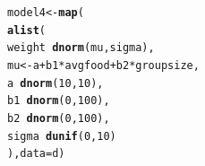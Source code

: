 \documentclass[12pt]{article}\usepackage[]{graphicx}\usepackage[]{color}
\makeatletter
\newcommand{\hlnum}[1]{\textcolor[rgb]{0.686,0.059,0.569}{#1}}%
\newcommand{\hlopt}[1]{\textcolor[rgb]{0,0,0}{#1}}%
\newcommand{\hlstd}[1]{\textcolor[rgb]{0.345,0.345,0.345}{#1}}%
\newcommand{\hlkwb}[1]{\textcolor[rgb]{0.69,0.353,0.396}{#1}}%
\newcommand{\hlkwc}[1]{\textcolor[rgb]{0.333,0.667,0.333}{#1}}%
\newcommand{\hlkwd}[1]{\textcolor[rgb]{0.737,0.353,0.396}{\textbf{#1}}}%
\newenvironment{kframe}{%
 \def\at@end@of@kframe{}%
 \ifinner\ifhmode%
  \def\at@end@of@kframe{\end{minipage}}%
  \begin{minipage}{\columnwidth}%
 \fi\fi%
 \def\FrameCommand##1{\hskip\@totalleftmargin \hskip-\fboxsep
 \colorbox{shadecolor}{##1}\hskip-\fboxsep
     \hskip-\linewidth \hskip-\@totalleftmargin \hskip\columnwidth}%
 \MakeFramed {\advance\hsize-\width
   \@totalleftmargin\z@ \linewidth\hsize
   \@setminipage}}%
 {\par\unskip\endMakeFramed%
 \at@end@of@kframe}
\newenvironment{knitrout}{}{} %
\makeatother
\begin{document}
\begin{knitrout}
\color{fgcolor}\begin{kframe}
\begin{alltt}
\hlstd{model4} \hlkwb{<-} \hlkwd{map}\hlstd{(}
  \hlkwd{alist}\hlstd{(}
    \hlstd{weight} \hlopt{~} \hlkwd{dnorm}\hlstd{(mu, sigma),}
    \hlstd{mu} \hlkwb{<-} \hlstd{a} \hlopt{+} \hlstd{b1} \hlopt{*} \hlstd{avgfood} \hlopt{+} \hlstd{b2} \hlopt{*} \hlstd{groupsize,}
    \hlstd{a} \hlopt{~} \hlkwd{dnorm}\hlstd{(}\hlnum{10}\hlstd{,} \hlnum{10}\hlstd{),}
    \hlstd{b1} \hlopt{~} \hlkwd{dnorm}\hlstd{(}\hlnum{0}\hlstd{,} \hlnum{100}\hlstd{),}
    \hlstd{b2} \hlopt{~} \hlkwd{dnorm}\hlstd{(}\hlnum{0}\hlstd{,} \hlnum{100}\hlstd{),}
    \hlstd{sigma} \hlopt{~} \hlkwd{dunif}\hlstd{(}\hlnum{0}\hlstd{,} \hlnum{10}\hlstd{)}
  \hlstd{),} \hlkwc{data} \hlstd{= d)}


\end{alltt}
\end{kframe}
\end{knitrout}
\end{document}
